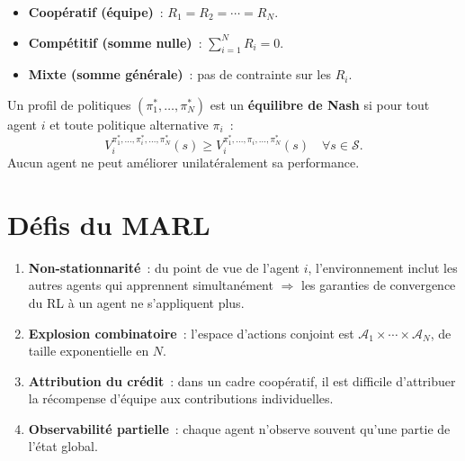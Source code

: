 \begin{definition}
\begin{itemize}
    \item \textbf{Coop\'eratif (\'equipe)}~: $R_1 = R_2 = \cdots = R_N$.
    \item \textbf{Comp\'etitif (somme nulle)}~: $\sum_{i=1}^N R_i = 0$.
    \item \textbf{Mixte (somme g\'en\'erale)}~: pas de contrainte sur les $R_i$.
\end{itemize}
\end{definition}

\begin{definition}
Un profil de politiques $(\pi_1^*, \ldots, \pi_N^*)$ est un \textbf{\'equilibre de Nash}
si pour tout agent $i$ et toute politique alternative $\pi_i$~:
\[
    V_i^{\pi_1^*, \ldots, \pi_i^*, \ldots, \pi_N^*}(s)
    \geq V_i^{\pi_1^*, \ldots, \pi_i, \ldots, \pi_N^*}(s)
    \quad \forall s \in \mathcal{S}.
\]
Aucun agent ne peut am\'eliorer unilat\'eralement sa performance.
\end{definition}

\section{D\'efis du MARL}

\begin{attention}[title=\textbf{D\'efis fondamentaux}]
\begin{enumerate}
    \item \textbf{Non-stationnarit\'e}~: du point de vue de l'agent $i$, l'environnement
    inclut les autres agents qui apprennent simultan\'ement $\Rightarrow$ les garanties
    de convergence du RL \`a un agent ne s'appliquent plus.
    \item \textbf{Explosion combinatoire}~: l'espace d'actions conjoint est
    $\mathcal{A}_1 \times \cdots \times \mathcal{A}_N$, de taille exponentielle en $N$.
    \item \textbf{Attribution du cr\'edit}~: dans un cadre coop\'eratif, il est difficile
    d'attribuer la r\'ecompense d'\'equipe aux contributions individuelles.
    \item \textbf{Observabilit\'e partielle}~: chaque agent n'observe souvent qu'une
    partie de l'\'etat global.
\end{enumerate}
\end{attention}


